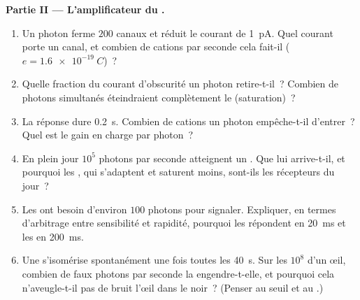 \begin{problem}
\medskip
\noindent\textbf{Partie II --- L'amplificateur du .}
\begin{enumerate}[resume]
  \item Un photon ferme $200$ canaux et réduit le courant de
        \qty{1}{pA}. Quel courant porte un canal, et combien de cations
        par seconde cela fait-il ($e = \qty{1.6e-19}{C}$)~?
  \item Quelle fraction du courant d'obscurité un photon retire-t-il~?
        Combien de photons simultanés éteindraient complètement le
         (saturation)~?
  \item La réponse dure \qty{0.2}{s}. Combien de cations un photon
        empêche-t-il d'entrer~? Quel est le gain en charge par photon~?
  \item En plein jour $10^{5}$ photons par seconde atteignent un
        . Que lui arrive-t-il, et pourquoi les , qui
        s'adaptent et saturent moins, sont-ils les récepteurs du jour~?
  \item Les  ont besoin d'environ $100$ photons pour signaler.
        Expliquer, en termes d'arbitrage entre sensibilité et rapidité,
        pourquoi les  répondent en \qty{20}{ms} et les  en
        \qty{200}{ms}.
  \item Une  s'isomérise spontanément une fois toutes les
        \qty{40}{s}. Sur les $10^{8}$  d'un œil, combien de
        faux photons par seconde la  engendre-t-elle, et pourquoi
        cela n'aveugle-t-il pas de bruit l'œil dans le noir~? (Penser au
        seuil et au .)
\end{enumerate}


\end{problem}
